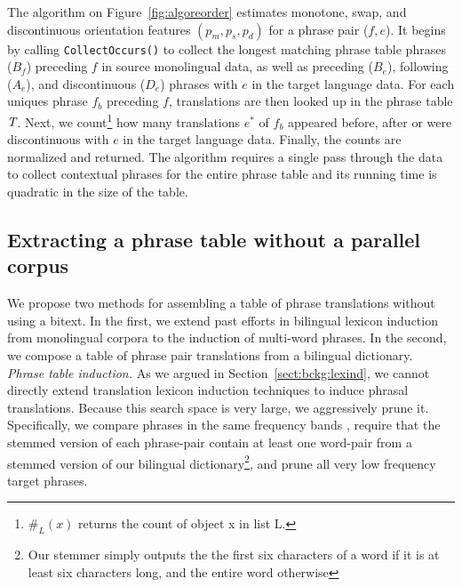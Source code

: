 \documentclass[11pt]{article}
\newcommand{\mnote}[1]{\marginpar{%
  \vskip-\baselineskip
  \raggedright\footnotesize
  \itshape\hrule\smallskip\tiny{#1}\par\smallskip\hrule}}
\newcommand{\mtodo}[1]{\mnote{\textcolor{red}{#1}}}
\newcommand{\todo}[1]{\textcolor{red}{TODO: #1}}
\newcommand{\secref}[1]{Section~\ref{#1}}
\newcommand{\figref}[1]{Figure~\ref{#1}}
\begin{document}
The algorithm on \figref{fig:algoreorder} estimates monotone, swap, and discontinuous orientation features $(p_m, p_s, p_d)$ for a phrase pair ($f, e$).  It begins by calling {\tt \small CollectOccurs()} to collect the longest matching phrase table phrases ($B_f$) preceding $f$ in source monolingual data, as well as preceding ($B_e$), following ($A_e$), and discontinuous ($D_e$) phrases with $e$ in the target language data.  For each uniques phrase $f_{b}$ preceding $f$, translations are then looked up in the phrase table $\emph{T}$.  Next, we count\footnote{$\#_{L}(x)$ returns the count of object x in list L.} how many translations $e^*$ of $f_b$ appeared before, after or were discontinuous with $e$ in the target language data.  Finally, the counts are normalized and returned. \mtodo{Be more specific about the out-of-order counts?}  The algorithm requires a single pass through the data to collect contextual phrases for the entire phrase table and its running time is quadratic in the size of the table.\mtodo{Check}

\subsection{Extracting a phrase table without a parallel corpus}  \label{sect:extract}
We propose two methods for assembling a table of phrase translations without using a bitext. In the first, we extend past efforts in bilingual lexicon induction from monolingual corpora to the induction of multi-word phrases. In the second, we compose a table of phrase pair translations from a bilingual dictionary.\\

\noindent\emph{Phrase table induction.} As we argued in \secref{sect:bckg:lexind}, we cannot directly extend translation lexicon induction techniques to induce phrasal translations.  Because this search space is very large, we aggressively prune it.   Specifically, we compare phrases in the same frequency bands \cite{Uszkoreit:2010}, require that the stemmed version of each phrase-pair contain at least one word-pair from a stemmed version of our bilingual dictionary\footnote{Our stemmer simply outputs the the first six characters of a word if it is at least six characters long, and the entire word otherwise}, and prune all very low frequency target phrases. %
\end{document}
